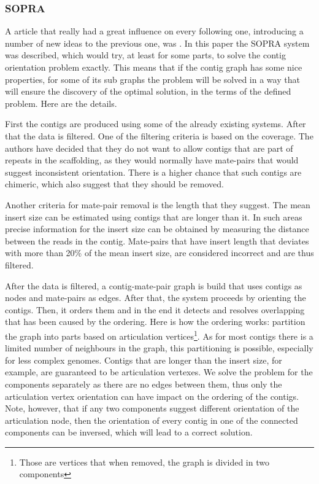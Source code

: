 \documentclass[11pt]{article}
\begin{document}
\subsubsection{SOPRA} %
\label{ssub:SOPRA}
A article that really had a great influence on every following one, introducing
a number of new ideas to the previous one, was \cite{SOPRA}. In this paper the
SOPRA system was described, which would try, at least for some parts, to solve
the contig orientation problem exactly. This means that if the contig graph has
some nice properties, for some of its sub graphs the problem will be solved in a
way that will ensure the discovery of the optimal solution, in the terms of the
defined problem. Here are the details.

First the contigs are produced using some of the already existing systems. After
that the data is filtered. One of the filtering criteria is based on the
coverage. The authors have decided that they do not want to allow contigs that
are part of repeats in the scaffolding, as they would normally have mate-pairs
that would suggest inconsistent orientation. There is a higher chance that such
contigs are chimeric, which also suggest that they should be removed.

Another criteria for mate-pair removal is the length that they suggest. The
mean insert size can be estimated using contigs that are longer than it. In such
areas precise information for the insert size can be obtained by measuring the
distance between the reads in the contig. Mate-pairs that have insert length
that deviates with more than 20\% of the mean insert size, are considered
incorrect and are thus filtered.

After the data is filtered, a contig-mate-pair graph is build that uses contigs
as nodes and mate-pairs as edges. After that, the system proceeds by orienting
the contigs. Then, it orders them and in the end it detects and resolves
overlapping that has been caused by the ordering. Here is how the ordering
works: partition the graph into parts based on articulation
vertices\footnote{Those are vertices that when removed, the graph is divided in
two components}. As for most contigs there is a limited number of neighbours in
the graph, this partitioning is possible, especially for less complex genomes.
Contigs that are longer than the insert size, for example, are guaranteed to be
articulation vertexes. We solve the problem for the components separately as
there are no edges between them, thus only the articulation vertex orientation
can have impact on the ordering of the contigs. Note, however, that if any two
components suggest different orientation of the articulation node, then the
orientation of every contig in one of the connected components can be inversed,
which will lead to a correct solution.
\end{document}
